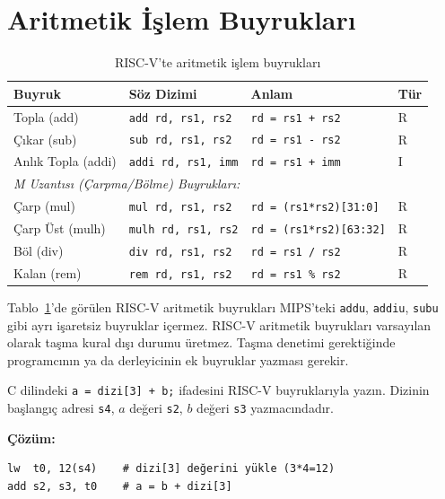 \section{Aritmetik İşlem Buyrukları}
\label{sec:aritmetik-buyruklar}

\begin{table}[H]
\centering
\caption{RISC-V'te aritmetik işlem buyrukları}
\label{tab:aritmetik-buyruklar}
\small
\begin{tabular}{llll}
\toprule
\textbf{Buyruk} & \textbf{Söz Dizimi} & \textbf{Anlam} & \textbf{Tür} \\
\midrule
Topla (add)         & \texttt{add rd, rs1, rs2}   & \texttt{rd = rs1 + rs2}       & R \\
Çıkar (sub)         & \texttt{sub rd, rs1, rs2}   & \texttt{rd = rs1 - rs2}       & R \\
Anlık Topla (addi)  & \texttt{addi rd, rs1, imm}  & \texttt{rd = rs1 + imm}       & I \\
\midrule
\multicolumn{4}{l}{\textit{M Uzantısı (Çarpma/Bölme) Buyrukları:}} \\
\midrule
Çarp (mul)          & \texttt{mul rd, rs1, rs2}   & \texttt{rd = (rs1*rs2)[31:0]}  & R \\
Çarp Üst (mulh)     & \texttt{mulh rd, rs1, rs2}  & \texttt{rd = (rs1*rs2)[63:32]} & R \\
Böl (div)           & \texttt{div rd, rs1, rs2}   & \texttt{rd = rs1 / rs2}        & R \\
Kalan (rem)         & \texttt{rem rd, rs1, rs2}   & \texttt{rd = rs1 \% rs2}       & R \\
\bottomrule
\end{tabular}
\end{table}

Tablo~\ref{tab:aritmetik-buyruklar}'de görülen RISC-V aritmetik buyrukları MIPS'teki \texttt{addu}, \texttt{addiu}, \texttt{subu} gibi ayrı işaretsiz buyruklar içermez. RISC-V aritmetik buyrukları varsayılan olarak taşma kural dışı durumu üretmez. Taşma denetimi gerektiğinde programcının ya da derleyicinin ek buyruklar yazması gerekir.

\begin{ornek}[3.10]
C dilindeki \texttt{a = dizi[3] + b;} ifadesini RISC-V buyruklarıyla yazın. Dizinin başlangıç adresi \texttt{s4}, $a$ değeri \texttt{s2}, $b$ değeri \texttt{s3} yazmacındadır.

\textbf{Çözüm:}
\begin{lstlisting}[style=riscv]
lw  t0, 12(s4)    # dizi[3] değerini yükle (3*4=12)
add s2, s3, t0    # a = b + dizi[3]
\end{lstlisting}
\end{ornek}


